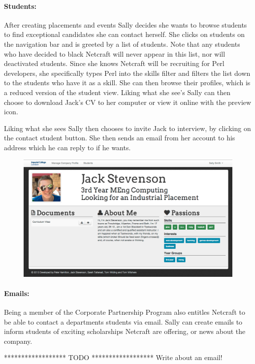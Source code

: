   \paragraph{Students:}
    After creating placements and events Sally decides she wants to browse students to find exceptional candidates she can contact herself. She clicks on students on the navigation bar and is greeted by a list of students. Note that any students who have decided to black Netcraft will never appear in this list, nor will deactivated students.
    Since she knows Netcraft will be recruiting for Perl developers, she specifically types Perl into the skills filter
    and filters the list down to the students who have it as a skill.
    She can then browse their profiles, which is a reduced version of the student view. Liking what she see's Sally can then choose to download Jack's CV to her computer or view it online with the preview icon. 

    Liking what she sees Sally then chooses to invite Jack to interview, by clicking on the contact student button. She then sends an email from her account to his address which he can reply to if he wants. 

    \begin{figure}[H]\centering
    \includegraphics[scale=0.3]{images/user_experiences/company/jack_profile}
    \end{figure}

  \paragraph{Emails:}
    Being a member of the Corporate Partnership Program also entitles Netcraft to be able to contact a departments students via email. Sally can create emails to inform students of exciting scholarships Netcraft are offering, or news about the company.

    ****************** TODO ******************
    Write about an email!

